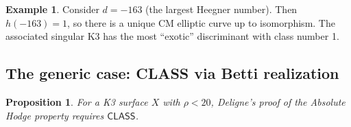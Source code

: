 \documentclass[11pt,a4paper]{article}
\theoremstyle{plain}
\newtheorem{proposition}[theorem]{Proposition}
\theoremstyle{definition}
\newtheorem{example}[theorem]{Example}
\newcommand{\CLASS}{\textsf{CLASS}}
\begin{document}
\begin{example}
Consider $d = -163$ (the largest Heegner number). Then $h(-163) = 1$, so there is a unique CM elliptic curve up to isomorphism. The associated singular K3 has the most ``exotic'' discriminant with class number 1.
\end{example}

\subsection{The generic case: CLASS via Betti realization}\label{sec:generic-class}

\begin{proposition}\label{prop:generic-class}
For a K3 surface $X$ with $\rho < 20$, Deligne's proof of the Absolute Hodge property requires $\CLASS$.
\end{proposition}
\end{document}
